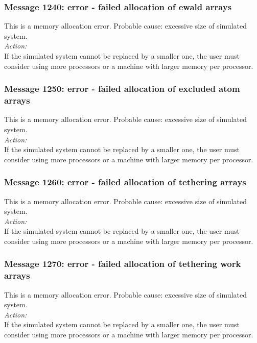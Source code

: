 \subsubsection*{Message 1240: error - failed allocation of ewald
arrays}

This is a memory allocation error. Probable cause: excessive size of
simulated system. \\

\noindent
{\em Action:}\\
If the simulated system cannot be replaced by a smaller one, the user
must consider using more processors or a machine with larger memory
per processor.

\subsubsection*{Message 1250: error - failed allocation of excluded
atom arrays}

This is a memory allocation error. Probable cause: excessive size of
simulated system. \\

\noindent
{\em Action:}\\
If the simulated system cannot be replaced by a smaller one, the user
must consider using more processors or a machine with larger memory
per processor.

\subsubsection*{Message 1260: error - failed allocation of tethering
arrays}

This is a memory allocation error. Probable cause: excessive size of
simulated system. \\

\noindent
{\em Action:}\\
If the simulated system cannot be replaced by a smaller one, the user
must consider using more processors or a machine with larger memory
per processor.

\subsubsection*{Message 1270: error - failed allocation of tethering
work arrays}

This is a memory allocation error. Probable cause: excessive size of
simulated system. \\

\noindent
{\em Action:}\\
If the simulated system cannot be replaced by a smaller one, the user
must consider using more processors or a machine with larger memory
per processor.

